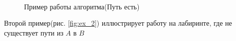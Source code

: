 \documentclass[12pt]{article}
\begin{document}
\begin{figure}[H]
\begin{minipage}[h]{0.32\linewidth}
	\end{minipage}
	\hfill
	\begin{minipage}[h]{0.32\linewidth}
		\\
	\end{minipage}
	\hfill
	\caption{Пример работы алгоритма(Путь есть)}
	\label{fig:ex_1}
\end{figure}

Второй пример(рис. \ref{fig:ex_2}) иллюстрирует работу на лабиринте, где не существует пути из $A$ в $B$
\end{document}
